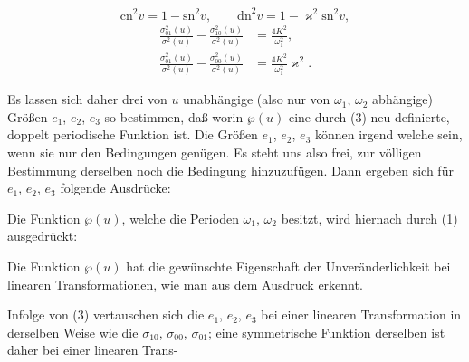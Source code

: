 \[ \mathrm{cn}^2v = 1-\mathrm{sn}^2v, \qquad \mathrm{dn}^2v = 1-\varkappa^2\mathrm{sn}^2v, \]
\[
\begin{aligned}
\frac{\sigma_{01}^2(u)}{\sigma^2(u)}-\frac{\sigma_{10}^2(u)}{\sigma^2(u)} &= \frac{4K^2}{\omega_1^2}, \\
\frac{\sigma_{01}^2(u)}{\sigma^2(u)}-\frac{\sigma_{00}^2(u)}{\sigma^2(u)} &= \frac{4K^2}{\omega_1^2}\varkappa^2.
\end{aligned}
\]

Es lassen sich daher drei von $u$ unabhängige (also nur von $\omega_1$, $\omega_2$ abhängige)
Größen $e_1$, $e_2$, $e_3$ so bestimmen, daß
worin $\wp(u)$ eine durch (3) neu definierte, doppelt periodische Funktion ist. Die
Größen $e_1$, $e_2$, $e_3$ können irgend welche sein, wenn sie nur den Bedingungen
genügen. Es steht uns also frei, zur völligen Bestimmung derselben noch die Bedingung
hinzuzufügen. Dann ergeben sich für $e_1$, $e_2$, $e_3$ folgende Ausdrücke:

Die Funktion $\wp(u)$, welche die Perioden $\omega_1$, $\omega_2$ besitzt, wird hiernach durch (1)
ausgedrückt:

Die Funktion $\wp(u)$ hat die gewünschte Eigenschaft der Unveränderlichkeit bei linearen
Transformationen, wie man aus dem Ausdruck
erkennt.

Infolge von (3) vertauschen sich die $e_1$, $e_2$, $e_3$ bei einer linearen Transformation
in derselben Weise wie die $\sigma_{10}$, $\sigma_{00}$, $\sigma_{01}$; eine symmetrische Funktion
derselben ist daher bei einer linearen Trans-
